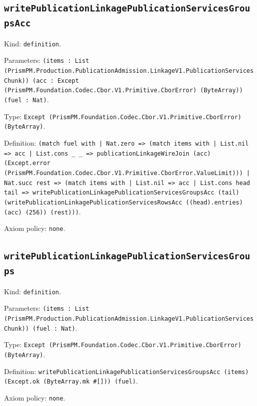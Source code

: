 \documentclass[11pt]{article}
\begin{document}
\subsection*{\texttt{writePublicationLinkagePublicationServicesGroupsAcc}}
\noindent Kind: \texttt{definition}.\par
\noindent Parameters: \texttt{(items : List (PrismPM.Production.PublicationAdmission.LinkageV1.PublicationServicesChunk)) (acc : Except (PrismPM.Foundation.Codec.Cbor.V1.Primitive.CborError) (ByteArray)) (fuel : Nat)}.\par
\noindent Type: \texttt{Except (PrismPM.Foundation.Codec.Cbor.V1.Primitive.CborError) (ByteArray)}.\par
\noindent Definition: \texttt{(match fuel with | Nat.zero => (match items with | List.nil => acc | List.cons \_ \_ => publicationLinkageWireJoin (acc) (Except.error (PrismPM.Foundation.Codec.Cbor.V1.Primitive.CborError.ValueLimit))) | Nat.succ rest => (match items with | List.nil => acc | List.cons head tail => writePublicationLinkagePublicationServicesGroupsAcc (tail) (writePublicationLinkagePublicationServicesRowsAcc ((head).entries) (acc) (256)) (rest)))}.\par
\noindent Axiom policy: \texttt{none}.\par
\subsection*{\texttt{writePublicationLinkagePublicationServicesGroups}}
\noindent Kind: \texttt{definition}.\par
\noindent Parameters: \texttt{(items : List (PrismPM.Production.PublicationAdmission.LinkageV1.PublicationServicesChunk)) (fuel : Nat)}.\par
\noindent Type: \texttt{Except (PrismPM.Foundation.Codec.Cbor.V1.Primitive.CborError) (ByteArray)}.\par
\noindent Definition: \texttt{writePublicationLinkagePublicationServicesGroupsAcc (items) (Except.ok (ByteArray.mk \#[])) (fuel)}.\par
\noindent Axiom policy: \texttt{none}.\par
\end{document}
